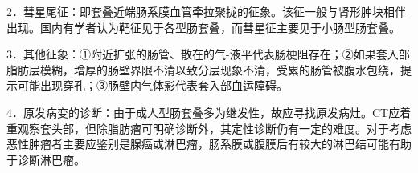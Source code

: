 2．彗星尾征：即套叠近端肠系膜血管牵拉聚拢的征象。该征一般与肾形肿块相伴出现。国内有学者认为靶征见于各型肠套叠，而彗星征主要见于小肠型肠套叠。

3．其他征象：①附近扩张的肠管、散在的气-液平代表肠梗阻存在；②如果套入部脂肪层模糊，增厚的肠壁界限不清以致分层现象不清，受累的肠管被腹水包绕，提示可能出现穿孔；③肠壁内气体影代表套入部血运障碍。

4．原发病变的诊断：由于成人型肠套叠多为继发性，故应寻找原发病灶。CT应着重观察套头部，但除脂肪瘤可明确诊断外，其定性诊断仍有一定的难度。对于考虑恶性肿瘤者主要应鉴别是腺癌或淋巴瘤，肠系膜或腹膜后有较大的淋巴结可能有助于诊断淋巴瘤。

\protect\hypertarget{text00025.html}{}{}

